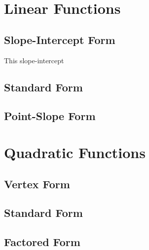 \documentclass[11pt]{article}
\begin{document}
 \section{Linear Functions}
 	\subsection{Slope-Intercept Form}
 	This slope-intercept 
 	 \subsection{Standard Form}
 	 \subsection{Point-Slope Form}
 	
  \section{Quadratic Functions}
  \subsection{Vertex Form}
  \subsection{Standard Form}
  \subsection{Factored Form}
  
 
 
\end{document}

